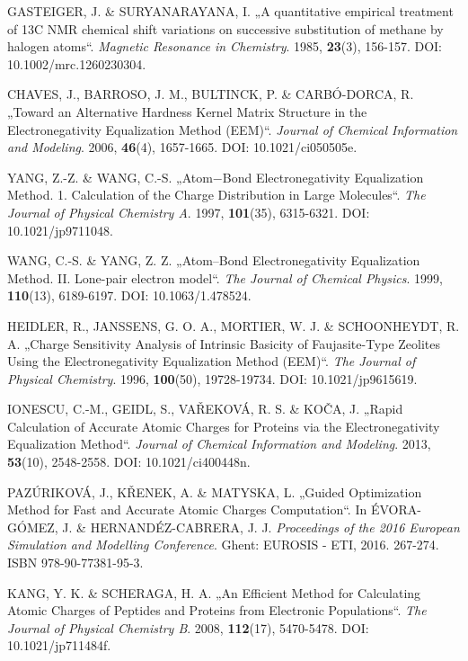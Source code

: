 \begin{thebibliography}{10}
GASTEIGER, J. \& SURYANARAYANA, I. „A quantitative empirical treatment of 13C NMR chemical shift variations on successive substitution of methane by halogen atoms“. \textit{Magnetic Resonance in Chemistry}. 1985, \textbf{23}(3), 156-157. DOI: 10.1002/mrc.1260230304. 

CHAVES, J., BARROSO, J. M., BULTINCK, P. \& CARBÓ-DORCA, R. „Toward an Alternative Hardness Kernel Matrix Structure in the Electronegativity Equalization Method (EEM)“. \textit{Journal of Chemical Information and Modeling}. 2006, \textbf{46}(4), 1657-1665. DOI: 10.1021/ci050505e.

YANG, Z.-Z. \& WANG, C.-S. „Atom−Bond Electronegativity Equalization Method. 1. Calculation of the Charge Distribution in Large Molecules“. \textit{The Journal of Physical Chemistry A}. 1997, \textbf{101}(35), 6315-6321. DOI: 10.1021/jp9711048. 

WANG, C.-S. \& YANG, Z. Z. „Atom–Bond Electronegativity Equalization Method. II. Lone-pair electron model“. \textit{The Journal of Chemical Physics}. 1999, \textbf{110}(13), 6189-6197. DOI: 10.1063/1.478524.

HEIDLER, R., JANSSENS, G. O. A., MORTIER, W. J. \& SCHOONHEYDT, R. A. „Charge Sensitivity Analysis of Intrinsic Basicity of Faujasite-Type Zeolites Using the Electronegativity Equalization Method (EEM)“. \textit{The Journal of Physical Chemistry}. 1996, \textbf{100}(50), 19728-19734. DOI: 10.1021/jp9615619.

IONESCU, C.-M., GEIDL, S., VAŘEKOVÁ, R. S. \& KOČA, J. „Rapid Calculation of Accurate Atomic Charges for Proteins via the Electronegativity Equalization Method“. \textit{Journal of Chemical Information and Modeling}. 2013, \textbf{53}(10), 2548-2558. DOI: 10.1021/ci400448n.

PAZÚRIKOVÁ, J., KŘENEK, A. \& MATYSKA, L. „Guided Optimization Method for Fast and Accurate Atomic Charges Computation“. In ÉVORA-GÓMEZ, J. \& HERNANDÉZ-CABRERA, J. J. \textit{Proceedings of the 2016 European Simulation and Modelling Conference}. Ghent: EUROSIS - ETI, 2016. 267-274. ISBN 978-90-77381-95-3.

KANG, Y. K. \& SCHERAGA, H. A. „An Efficient Method for Calculating Atomic Charges of Peptides and Proteins from Electronic Populations“. \textit{The Journal of Physical Chemistry B}. 2008, \textbf{112}(17), 5470-5478. DOI: 10.1021/jp711484f.


\end{thebibliography}
